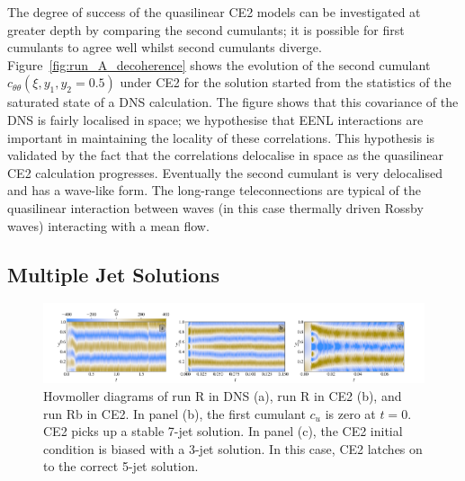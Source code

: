 \documentclass{jfm}
\newcommand{\cu}{c_u}
\newcommand{\ctt}{c_{\theta \theta}}
\begin{document}
The degree of success of the quasilinear CE2 models can be investigated at greater depth by comparing the second cumulants; it is possible for first cumulants to agree well whilst second cumulants diverge. Figure~\ref{fig:run_A_decoherence} shows the evolution of the second cumulant $\ctt(\xi, y_1, y_2 = 0.5)$ under CE2 for the solution started from the statistics of the saturated state of a DNS calculation. The figure shows that this covariance of the DNS is fairly localised in space; we hypothesise that EENL interactions are important in maintaining the locality of these correlations. This hypothesis is validated by the fact that the correlations delocalise in space as the quasilinear CE2 calculation progresses. Eventually the second cumulant is very delocalised and has a wave-like form. The long-range teleconnections are typical of the quasilinear interaction between waves (in this case thermally driven Rossby waves) interacting with a mean flow.

\subsection{Multiple Jet Solutions}
\begin{figure}
  \centering
  \includegraphics[width=\textwidth]{../../figs/run_R_S_hov_cu_dns_ce2.pdf}
  \caption{Hovmoller diagrams of run R in DNS (a),  run R in CE2 (b), and run Rb in CE2. In panel (b), the first cumulant $\cu$ is zero at $t = 0$. CE2 picks up a stable 7-jet solution. In panel (c), the CE2 initial condition is biased with a 3-jet solution. In this case, CE2 latches on to the correct 5-jet solution.}
  \label{fig:hov_run_R}
\end{figure}
\end{document}
